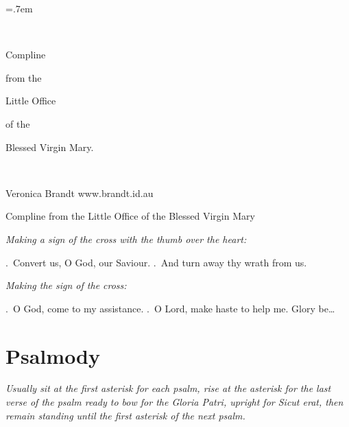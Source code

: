 \documentclass[12pt,a5paper]{memoir}
\newcommand{\rubrics}[1]{\noindent\textit{#1}}
\begin{document}
\parindent=.7em %
%

\ 

\vskip1in

\begin{centering}

\HUGE \vectis Compline 

\bigskip

\large from the 

\LARGE Little Office

\bigskip


\large of the 

\LARGE Blessed Virgin Mary.

\newpage

\ 

\vfill

\normalsize {} Veronica Brandt www.brandt.id.au

\newpage

\Huge \vectis Compline \large from the Little Office of the Blessed Virgin Mary

\end{centering}

\rubrics{Making a sign of the cross with the thumb over the heart:}





\noindent \Vbar.\ Convert us, O God, our Saviour.
\Rbar.\ And turn away thy wrath from us.

\rubrics{Making the sign of the cross:}


\Vbar.\ O God, come to my assistance.
\Rbar.\ O Lord, make haste to help me.
Glory be\ldots

\section*{Psalmody}

\rubrics{Usually sit at the first asterisk for each psalm, rise at the asterisk for the last verse of the psalm ready to bow for the \emph{Gloria Patri}, upright for \emph{Sicut erat}, then remain standing until the first asterisk of the next psalm.}
\end{document}
